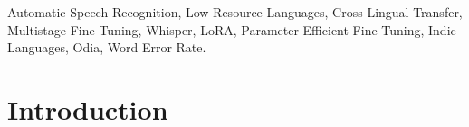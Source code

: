 \documentclass[conference]{IEEEtran}
\newcommand{\WRITE}[1]{{\color{red}\textbf{[WRITE: #1]}}}
\begin{document}
\begin{abstract}
\WRITE{abstract, about 170 words, in your own words. The Review-1 abstract
described a literature review; this one must state what was done and found.}
\end{abstract}

\begin{IEEEkeywords}
Automatic Speech Recognition, Low-Resource Languages, Cross-Lingual
Transfer, Multistage Fine-Tuning, Whisper, LoRA, Parameter-Efficient
Fine-Tuning, Indic Languages, Odia, Word Error Rate.
\end{IEEEkeywords}

\section{Introduction}
\end{document}
